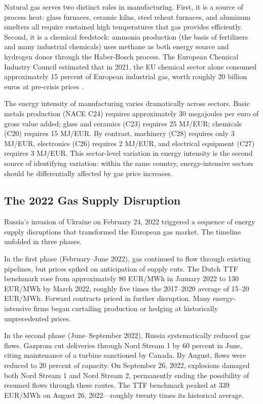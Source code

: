 \documentclass[12pt]{article}
\begin{document}
Natural gas serves two distinct roles in manufacturing. First, it is a source of process heat: glass furnaces, ceramic kilns, steel reheat furnaces, and aluminum smelters all require sustained high temperatures that gas provides efficiently. Second, it is a chemical feedstock: ammonia production (the basis of fertilizers and many industrial chemicals) uses methane as both energy source and hydrogen donor through the Haber-Bosch process. The European Chemical Industry Council estimated that in 2021, the EU chemical sector alone consumed approximately 15 percent of European industrial gas, worth roughly 20 billion euros at pre-crisis prices \citep{cefic2023}.

The energy intensity of manufacturing varies dramatically across sectors. Basic metals production (NACE C24) requires approximately 30 megajoules per euro of gross value added; glass and ceramics (C23) requires 25 MJ/EUR; chemicals (C20) requires 15 MJ/EUR. By contrast, machinery (C28) requires only 3 MJ/EUR, electronics (C26) requires 2 MJ/EUR, and electrical equipment (C27) requires 3 MJ/EUR. This sector-level variation in energy intensity is the second source of identifying variation: within the same country, energy-intensive sectors should be differentially affected by gas price increases.

\subsection{The 2022 Gas Supply Disruption}

Russia's invasion of Ukraine on February 24, 2022 triggered a sequence of energy supply disruptions that transformed the European gas market. The timeline unfolded in three phases.

In the first phase (February--June 2022), gas continued to flow through existing pipelines, but prices spiked on anticipation of supply cuts. The Dutch TTF benchmark rose from approximately 80 EUR/MWh in January 2022 to 130 EUR/MWh by March 2022, roughly five times the 2017--2020 average of 15--20 EUR/MWh. Forward contracts priced in further disruption. Many energy-intensive firms began curtailing production or hedging at historically unprecedented prices.

In the second phase (June--September 2022), Russia systematically reduced gas flows. Gazprom cut deliveries through Nord Stream 1 by 60 percent in June, citing maintenance of a turbine sanctioned by Canada. By August, flows were reduced to 20 percent of capacity. On September 26, 2022, explosions damaged both Nord Stream 1 and Nord Stream 2, permanently ending the possibility of resumed flows through these routes. The TTF benchmark peaked at 339 EUR/MWh on August 26, 2022---roughly twenty times its historical average.
\end{document}
